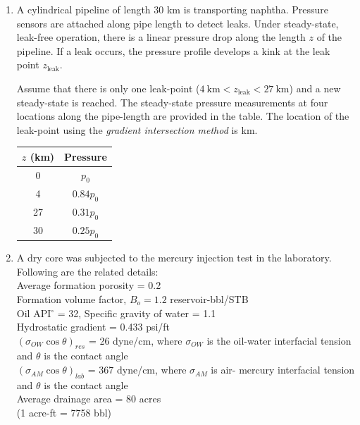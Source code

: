 \documentclass[journal,12pt,onecolumn]{IEEEtran}
\theoremstyle{remark}
\begin{document}
\begin{enumerate}
\hfill{}

\item A cylindrical pipeline of length 30 km is transporting naphtha. Pressure sensors are attached along pipe length to detect leaks. Under steady-state, leak-free operation, there is a linear pressure drop along the length $z$ of the pipeline. If a leak occurs, the pressure profile develops a kink at the leak point $z_{\text{leak}}$.

\vspace{0.2cm}
Assume that there is only one leak-point ($4~\text{km} < z_{\text{leak}} < 27~\text{km}$) and a new steady-state is reached. The steady-state pressure measurements at four locations along the pipe-length are provided in the table. The location of the leak-point using the \textit{gradient intersection method} is \underline{\hspace{2cm}} km.  

\hfill{}

\begin{tabular}{|c|c|}
\hline
$z$ (km) & Pressure \\
\hline
0 & $p_0$ \\
4 & $0.84p_0$ \\
27 & $0.31p_0$ \\
30 & $0.25p_0$ \\
\hline
\end{tabular}

\pagebreak

\item A dry core was subjected to the mercury injection test in the laboratory. Following are the related details: \\ 
Average formation porosity = 0.2 \\ 
Formation volume factor, $B_o = 1.2$ reservoir-bbl/STB \\ 
Oil API$^\circ$ = 32, Specific gravity of water = 1.1 \\ 
Hydrostatic gradient = 0.433 psi/ft \\ 
$(\sigma_{OW} \cos \theta)_{res}$ = 26 dyne/cm, where $\sigma_{OW}$ is the oil-water interfacial tension and $\theta$ is the contact angle \\ 
$(\sigma_{AM} \cos \theta)_{lab}$ = 367 dyne/cm, where $\sigma_{AM}$ is air- mercury interfacial tension and $\theta$ is the contact angle \\ 
Average drainage area = 80 acres \\ 
(1 acre-ft = 7758 bbl) \\ 


\end{enumerate}
\end{document}
